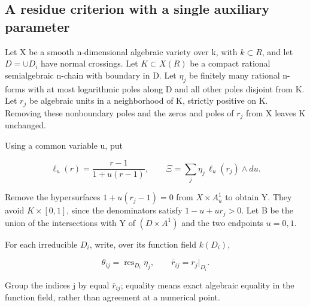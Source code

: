 \documentclass[11pt,a4paper,oneside]{article}
\theoremstyle{plain}
\theoremstyle{definition}
\theoremstyle{remark}
\numberwithin{equation}{section}
\begin{document}
\endgroup



\begingroup

\subsection{A residue criterion with a single auxiliary parameter}\label{sec:forest:1}

Let X be a smooth n-dimensional algebraic variety over k, with \(k\subset R\), and let \(D=\cup D_i\) have normal crossings. Let \(K\subset X(R)\) be a compact rational semialgebraic n-chain with boundary in D. Let \(\eta _j\) be finitely many rational n-forms with at most logarithmic poles along D and all other poles disjoint from K. Let \(r_j\) be algebraic units in a neighborhood of K, strictly positive on K. Removing these nonboundary poles and the zeros and poles of \(r_j\) from X leaves K unchanged.

Using a common variable u, put

\begin{equation}
\ell_u(r)=\frac{r-1}{1+u(r-1)},\qquad
 \Xi=\sum_j\eta_j\,\ell_u(r_j)\wedge du.                         \label{eq:forest:1}
\end{equation}

Remove the hypersurfaces \(1+u(r_j- 1)=0\) from \(X\times A^{1}_u\) to obtain Y. They avoid \(K\times [0,1]\), since the denominators satisfy \(1- u+ur_j>0\). Let B be the union of the intersections with Y of \((D\times A^{1})\) and the two endpoints \(u=0,1\).

For each irreducible \(D_i\), write, over its function field \(k(D_i)\),

\begin{equation}
\theta_{ij}=\operatorname{res}_{D_i}\eta_j,\qquad
 \bar r_{ij}=r_j|_{D_i}.
\end{equation}

Group the indices j by equal \(\bar r_{ij}\); equality means exact algebraic equality in the function field, rather than agreement at a numerical point.
\end{document}
